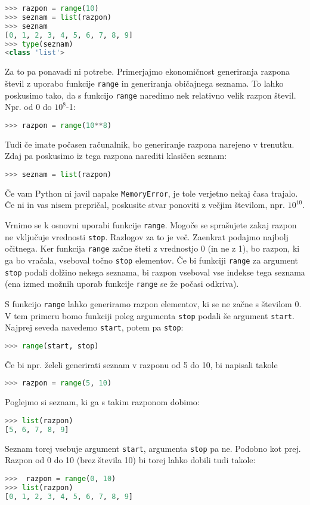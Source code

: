 \begin{lstlisting}[language=Python]
>>> razpon = range(10)
>>> seznam = list(razpon)
>>> seznam
[0, 1, 2, 3, 4, 5, 6, 7, 8, 9]
>>> type(seznam)
<class 'list'>
\end{lstlisting}
Za to pa ponavadi ni potrebe. Primerjajmo ekonomičnost generiranja razpona števil z uporabo funkcije \texttt{range} in generiranja običajnega seznama. To lahko poskusimo tako, da s funkcijo \texttt{range} naredimo nek relativno velik razpon števil. Npr. od 0 do $10^8$-1:
\begin{lstlisting}[language=Python]
>>> razpon = range(10**8)
\end{lstlisting}
Tudi če imate počasen računalnik, bo generiranje razpona narejeno v trenutku. Zdaj pa poskusimo iz tega razpona narediti klasičen seznam:
\begin{lstlisting}[language=Python]
>>> seznam = list(razpon)
\end{lstlisting}
Če vam Python ni javil napake \texttt{MemoryError}, je tole verjetno nekaj časa trajalo. Če ni in vas nisem prepričal, poskusite stvar ponoviti z večjim številom, npr. $10^{10}$. 

Vrnimo se k osnovni uporabi funkcije \texttt{range}. Mogoče se sprašujete zakaj razpon ne vključuje vrednosti \texttt{stop}. Razlogov za to je več. Zaenkrat podajmo najbolj očitnega. Ker funkcija \texttt{range} začne šteti z vrednostjo 0 (in ne z 1), bo razpon, ki ga bo vračala, vseboval točno \texttt{stop} elementov. Če bi funkciji \texttt{range} za argument \texttt{stop} podali dolžino nekega seznama, bi razpon vseboval vse indekse tega seznama (ena izmed možnih uporab funkcije \texttt{range} se že počasi odkriva). 

S funkcijo \texttt{range} lahko generiramo razpon elementov, ki se ne začne s številom 0. V tem primeru bomo funkciji poleg argumenta \texttt{stop} podali še argument \texttt{start}. Najprej seveda navedemo \texttt{start}, potem pa \texttt{stop}:
\begin{lstlisting}[language=Python]
>>> range(start, stop)
\end{lstlisting}
Če bi npr. želeli generirati seznam v razponu od 5 do 10, bi napisali takole
\begin{lstlisting}[language=Python]
>>> razpon = range(5, 10)
\end{lstlisting}
Poglejmo si seznam, ki ga s takim razponom dobimo:
\begin{lstlisting}[language=Python]
>>> list(razpon)
[5, 6, 7, 8, 9]
\end{lstlisting}
Seznam torej vsebuje argument \texttt{start}, argumenta \texttt{stop} pa ne. Podobno kot prej. Razpon od 0 do 10 (brez števila 10) bi torej lahko dobili tudi takole:
\begin{lstlisting}[language=Python]
>>>  razpon = range(0, 10)
>>> list(razpon)
[0, 1, 2, 3, 4, 5, 6, 7, 8, 9]
\end{lstlisting}

